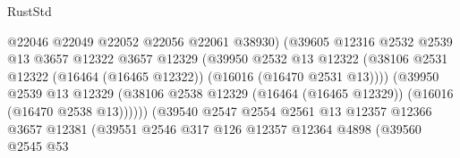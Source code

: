 \begin{lexlean}{RustStd}
\begin{coremodule}
                                          @22046
                                          @22049
                                          @22052
                                          @22056
                                          @22061
                                          @38930)
                                        (@39605
                                          @12316
                                          @2532
                                          @2539
                                          @13
                                          @3657
                                          @12322
                                          @3657
                                          @12329
                                          (@39950
                                            @2532
                                            @13
                                            @12322
                                            (@38106
                                              @2531
                                              @12322
                                              (@16464 (@16465 @12322))
                                              (@16016 (@16470 @2531 @13))))
                                          (@39950
                                            @2539
                                            @13
                                            @12329
                                            (@38106
                                              @2538
                                              @12329
                                              (@16464 (@16465 @12329))
                                              (@16016 (@16470 @2538 @13))))))
                                      (@39540
                                        @2547
                                        @2554
                                        @2561
                                        @13
                                        @12357
                                        @12366
                                        @3657
                                        @12381
                                        (@39551
                                          @2546
                                          @317
                                          @126
                                          @12357
                                          @12364
                                          @4898
                                          (@39560
                                            @2545
                                            @53

\end{coremodule}
\end{lexlean}
